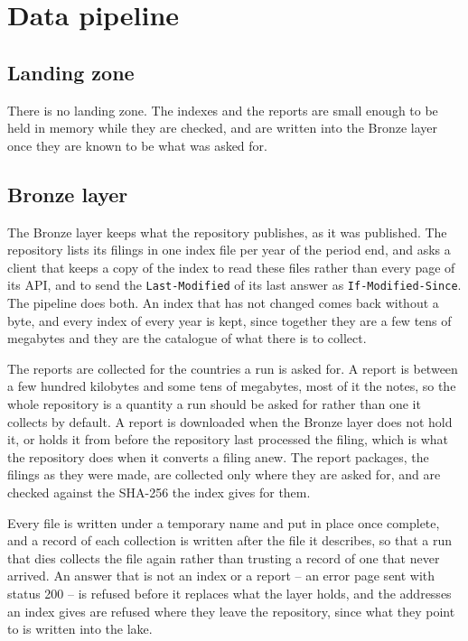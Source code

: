 \section{Data pipeline}

\subsection{Landing zone}

There is no landing zone. The indexes and the reports are small enough to be held in memory while they are checked, and are written into the Bronze layer once they are known to be what was asked for.

\subsection{Bronze layer}

The Bronze layer keeps what the repository publishes, as it was published. The repository lists its filings in one index file per year of the period end, and asks a client that keeps a copy of the index to read these files rather than every page of its API, and to send the \verb|Last-Modified| of its last answer as \verb|If-Modified-Since|. The pipeline does both. An index that has not changed comes back without a byte, and every index of every year is kept, since together they are a few tens of megabytes and they are the catalogue of what there is to collect.

The reports are collected for the countries a run is asked for. A report is between a few hundred kilobytes and some tens of megabytes, most of it the notes, so the whole repository is a quantity a run should be asked for rather than one it collects by default. A report is downloaded when the Bronze layer does not hold it, or holds it from before the repository last processed the filing, which is what the repository does when it converts a filing anew. The report packages, the filings as they were made, are collected only where they are asked for, and are checked against the SHA-256 the index gives for them.

Every file is written under a temporary name and put in place once complete, and a record of each collection is written after the file it describes, so that a run that dies collects the file again rather than trusting a record of one that never arrived. An answer that is not an index or a report -- an error page sent with status 200 -- is refused before it replaces what the layer holds, and the addresses an index gives are refused where they leave the repository, since what they point to is written into the lake.


